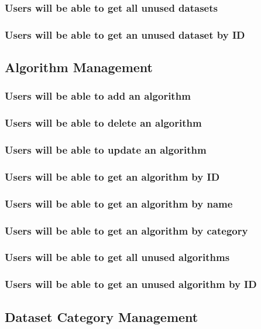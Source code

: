\subsubsection {Users will be able to get all unused datasets}
\subsubsection {Users will be able to get an unused dataset by ID}

\subsection{Algorithm Management}

\subsubsection {Users will be able to add an algorithm}
\subsubsection {Users will be able to delete an algorithm}
\subsubsection {Users will be able to update an algorithm}
\subsubsection {Users will be able to get an algorithm by ID}
\subsubsection {Users will be able to get an algorithm by name}
\subsubsection {Users will be able to get an algorithm by category}
\subsubsection {Users will be able to get all unused algorithms}
\subsubsection {Users will be able to get an unused algorithm by ID}

\subsection{Dataset Category Management}

